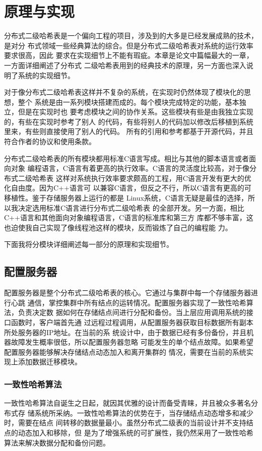 \chapter{原理与实现}\label{chapter:implementation}
分布式二级哈希表是一个偏向工程的项目，涉及到的大多是已经发展成熟的技术，是对分
布式领域一些经典算法的综合。但是分布式二级哈希表对系统的运行效率要求很高，因此
要求在实现细节上不能有瑕疵。本章是论文中篇幅最大的一章，一方面详细阐述了分布式
二级哈希表用到的经典技术的原理，另一方面也深入说明了系统的实现细节。

对于像分布式二级哈希表这样并不复杂的系统，在实现时仍然体现了模块化的思想，整个
系统是由一系列模块搭建而成的。每个模块完成特定的功能，基本独立，但是在实现时也
要考虑模块之间的协作关系。这些模块有些是由我独立实现的，有些在实现时参考了别人
的代码，有些将别人的代码加以修改后移植到系统里来，有些则直接使用了别人的代码。
所有的引用和参考都基于开源代码，并且符合作者的协议和使用条款。

分布式二级哈希表的所有模块都用标准C语言写成。相比与其他的脚本语言或者面向对象
编程语言，C语言有着更高的执行效率。C语言的灵活度比较高，对于像分布式二级哈希表
这样对系统执行效率要求颇高的工程，用C语言开发有更大的优化自由度。因为C++语言可
以兼容C语言，但反之不行，所以C语言有更高的可移植性。鉴于存储服务器上运行的都是
Linux系统，C语言无疑是最佳的选择，所以我决定选用标准C语言进行分布式二级哈希表
的全部开发。另一方面，相比C++语言和其他面向对象编程语言，C语言的标准库和第三方
库都不够丰富，这也迫使我自己实现了像线程池这样的模块，反而锻炼了自己的编程能
力。

下面我将分模块详细阐述每一部分的原理和实现细节。

\section{配置服务器}
配置服务器是整个分布式二级哈希表的核心。它通过与集群中每一个存储服务器进行心跳
通信，掌控集群中所有结点的运转情况。配置服务器实现了一致性哈希算法，负责决定数
据如何在存储结点间进行分配和备份。当上层应用调用系统的接口函数时，客户端首先通
过远程过程调用，从配置服务器获取目标数据所有副本所处服务器的IP地址。在当前的系
统设计中，由于数据已经有多份备份，并且机器故障发生概率很低，所以配置服务器忽略
可能发生的单个结点故障。如果希望配置服务器能够解决存储结点动态加入和离开集群的
情况，需要在当前的系统实现上添加数据迁移模块。

\subsection{一致性哈希算法}\label{subsection:consistent}
一致性哈希算法自诞生之日起，就因其优雅的设计而备受青睐，并且被众多著名分布式存
储系统所采纳。一致性哈希算法的优势在于，当存储结点动态增多和减少时，需要在结点
间转移的数据量最小。虽然分布式二级表的当前设计并不支持结点的动态加入和移除，但
是为了增强系统的可扩展性，我仍然采用了一致性哈希算法来解决数据分配和备份问题。

